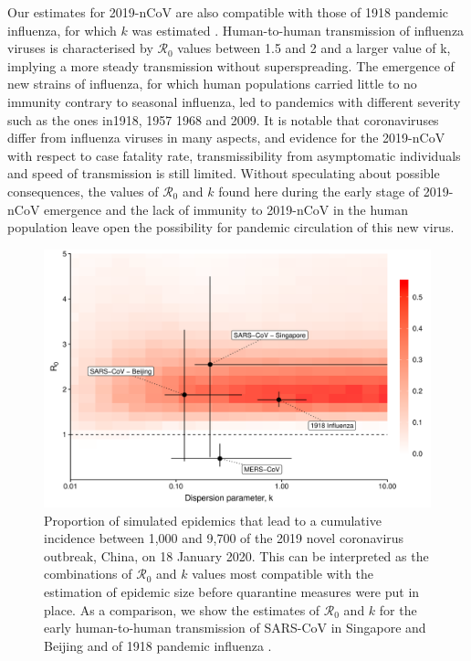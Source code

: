 \documentclass{article}
\begin{document}
Our estimates for 2019-nCoV are also compatible with those of 1918 pandemic influenza, for which $k$ was estimated \cite{Fraser:2011}. Human-to-human transmission of influenza viruses is characterised by $\mathcal{R}_0$ values between 1.5 and 2 and a larger value of k, implying a more steady transmission without superspreading. The emergence of new strains of influenza, for which human populations carried little to no immunity contrary to seasonal influenza, led to pandemics with different severity such as the ones in1918, 1957 1968 and 2009. It is notable that coronaviruses differ from influenza viruses in many aspects, and evidence for the 2019-nCoV with respect to case fatality rate, transmissibility from asymptomatic individuals and speed of transmission is still limited. Without speculating about possible consequences, the values of $\mathcal{R}_0$ and $k$ found here during the early stage of 2019-nCoV emergence and the lack of immunity to 2019-nCoV in the human population leave open the possibility for pandemic circulation of this new virus.

\begin{figure}[t]
	\centering
	\includegraphics[width=.95\linewidth]{../figure/fig_comb.png}
	\caption{Proportion of simulated epidemics that lead to a cumulative incidence between 1,000 and 9,700 of the 2019 novel coronavirus outbreak, China, on 18 January 2020. This can be interpreted as the combinations of $\mathcal{R}_0$ and $k$ values most compatible with the estimation of epidemic size before quarantine measures were put in place. As a comparison, we show the estimates of $\mathcal{R}_0$ and $k$ for the early human-to-human transmission of SARS-CoV in Singapore and Beijing and of 1918 pandemic influenza \cite{Lloyd-Smith:2005,Fraser:2011,Kucharski:2015b}.
	}
	\label{fig:fig_comb}
\end{figure}
\end{document}
